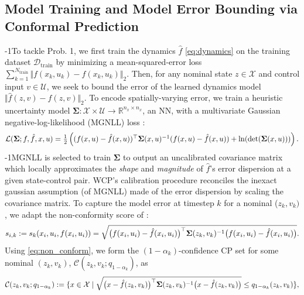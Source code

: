 \documentclass{l4dc2026}
\newcommand{\covariance}{\mathbf{\Sigma}}
\newcommand{\T}{^\top}
\newcommand{\red}[1]{{\color{red}{#1}}}
\renewcommand{\red}[1]{{\color{red}{#1}}}
\begin{document}
\subsection{Model Training and Model Error Bounding via Conformal Prediction}\label{sec:cp_err_bound}
\looseness-1To tackle Prob. 1, we first train the dynamics $\hat f$ \eqref{eq:dynamics} on the training dataset $\mathcal{D}_\textrm{train}$ by minimizing a mean-squared-error loss $\textstyle\sum_{k=1}^{N_\textrm{train}} \Vert f(x_k, u_k) - \hat f(x_k, u_k)\Vert_2$. Then, for any nominal state $z \in \mathcal{X}$ and control input $v \in \mathcal{U}$, we seek to bound the error of the learned dynamics model $\Vert \hat{f}(z, v)-f(z,v)\Vert_2 $. To encode spatially-varying error, we train a heuristic uncertainty model $\covariance: \mathcal{X}\times \mathcal{U} \to \mathbb{R}^{n_x \times n_x}$, an NN, with a multivariate Gaussian negative-log-likelihood (MGNLL) loss \citep{dasgupta2007line}:%
\begin{equation}\textstyle\small
\mathcal{L}(\covariance; f, \hat{f}, x, u) = \frac{1}{2} \left( (f(x,u) -\hat{f}(x,u))\T \covariance(x,u)^{-1} (f(x,u) -\hat{f}(x,u)) + \ln(\det(\covariance(x,u)))\right).
\end{equation}
\looseness-1MGNLL is selected to train $\mathbf{\Sigma}$ to output an uncalibrated covariance matrix which locally approximates the \textit{shape} and \textit{magnitude} of $\hat{f}$'s error dispersion at a given state-control pair. WCP's calibration procedure reconciles the inexact gaussian assumption (of MGNLL) made of the error dispersion by scaling the covariance matrix.   
To capture the model error at timestep $k$ for a nominal ($z_k, v_k)$, we adapt the non-conformity score of \cite{messoudi2022ellipsoidal}:
\begin{equation}\label{eq:non_conform}\small
s_{i,k} := s_k(x_i, u_i, f(x_i, u_i)) = \sqrt{\big(f(x_i, u_i) - \hat{f}(x_i, u_i)\big )\T\covariance(z_k,v_k)^{-1}\big(f(x_i, u_i) - \hat{f}(x_i, u_i)\big)}.
\end{equation}
Using \eqref{eq:non_conform}, we form the $(1-\alpha_k)$-confidence CP set for some nominal $(z_k, v_k)$, $\mathcal{C}(z_k, v_k; {q_{1-\alpha_k}})$, as
\begin{equation}\label{eq:ellip_prediction_set}\small
    \mathcal{C}(z_k,v_k; {q_{1-\alpha_k}}):= \{x \in \mathcal{X} \mid \sqrt{\big(x - \hat{f}(z_k,v_k)\big )\T\covariance(z_k,v_k)^{-1}\big(x - \hat{f}(z_k,v_k)\big)} \leq q_{1-\alpha_k}(z_k, v_k)\},
\end{equation}
\end{document}
